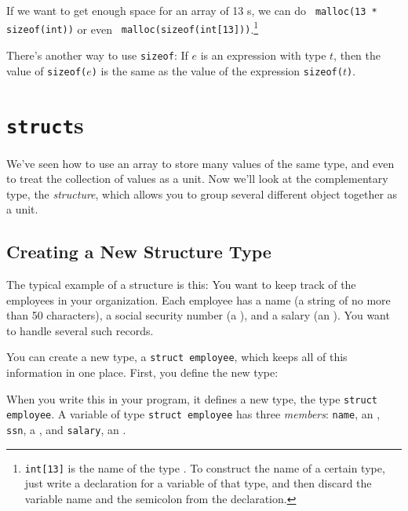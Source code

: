 If we want to get enough space for an array of 13 \int s, we can do {\tt
malloc(13 * sizeof(int))} or even {\tt
malloc(sizeof(int[13]))}.\footnote{{\tt int[13]} is the name of the type
.  To construct the name of a certain type, just write a
declaration for a variable of that type, and then discard the variable
name and the semicolon from the declaration.}

There's another way to use {\tt sizeof}: If $e$ is an expression with
type $t$, then the value of {\tt sizeof($e$)} is the same as the value
of the expression {\tt sizeof($t$)}.

\section{{\tt struct}s}

We've seen how to use an array to store many values of the same type,
and even to treat the collection of values as a unit.  Now we'll look at
the complementary type, the {\em structure}\/, which allows you to group
several different object together as a unit.

\subsection{Creating a New Structure Type}

The typical example of a structure is this:  You want to keep track of
the employees in your organization.  Each employee has a name (a string
of no more than 50 characters), a social security number (a \longint),
and a salary (an \int).  You want to handle several such records.

You can create a new type, a {\tt struct employee}, which keeps all of
this information in one place.  First, you define the new type:

\begin{flushleft}
\verb% struct employee {% \\*
\verb%   char name[51];% \\*
\verb%   long int ssn;% \\*
\verb%   int salary;% \\*
\verb%} ; % 
\end{flushleft}

When you write this in your program, it defines a new type, the type
{\tt struct employee}.  A variable of type {\tt struct employee} has
three {\em members}\/:  {\tt name}, an , {\tt ssn}, a
\longint, and {\tt salary}, an \int.  

